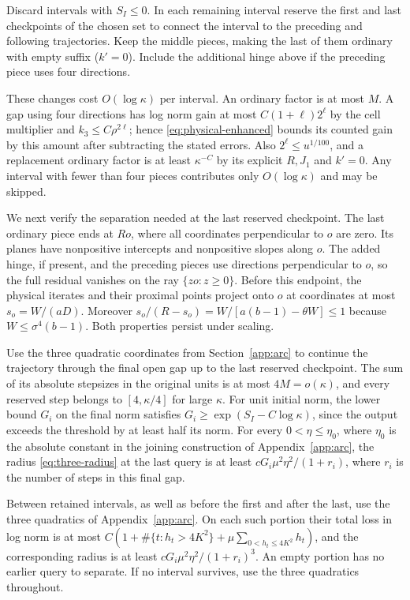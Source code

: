 \documentclass[11pt]{article}
\theoremstyle{definition}
\begin{document}
Discard intervals with $S_I\le0$. In each remaining interval reserve the first and last checkpoints of the chosen set to connect the interval to the preceding and following trajectories. Keep the middle pieces, making the last of them ordinary with empty suffix ($k'=0$). Include the additional hinge above if the preceding piece uses four directions.

These changes cost $O(\log\kappa)$ per interval. An ordinary factor is at most $M$. A gap using four directions has log norm gain at most $C(1+\ell)2^\ell$ by the cell multiplier and $k_3\le C\rho^{2\ell}$; hence \eqref{eq:physical-enhanced} bounds its counted gain by this amount after subtracting the stated errors. Also $2^\ell\le u^{1/100}$, and a replacement ordinary factor is at least $\kappa^{-C}$ by its explicit $R,J_1$ and $k'=0$. Any interval with fewer than four pieces contributes only $O(\log\kappa)$ and may be skipped.

We next verify the separation needed at the last reserved checkpoint.
The last ordinary piece ends at \(Ro\), where all coordinates perpendicular to $o$ are zero. Its planes have nonpositive intercepts and nonpositive slopes along $o$. The added hinge, if present, and the preceding pieces use directions perpendicular to $o$, so the full residual vanishes on the ray $\{zo:z\ge0\}$. Before this endpoint, the physical iterates and their proximal points project onto $o$ at coordinates at most $s_o=W/(aD)$. Moreover $s_o/(R-s_o)=W/[a(b-1)-\theta W]\le1$ because $W\le\sigma^4(b-1)$. Both properties persist under scaling.

Use the three quadratic coordinates from Section~\ref{app:arc} to continue the trajectory through the final open gap up to the last reserved checkpoint. The sum of its absolute stepsizes in the original units is at most $4M=o(\kappa)$, and every reserved step belongs to $[4,\kappa/4]$ for large $\kappa$. For unit initial norm, the lower bound $G_i$ on the final norm satisfies $G_i\ge\exp(S_I-C\log\kappa)$, since the output exceeds the threshold by at least half its norm. For every \(0<\eta\le\eta_0\), where \(\eta_0\) is the absolute constant
in the joining construction of Appendix~\ref{app:arc}, the radius
\eqref{eq:three-radius} at the last query is at least $cG_i\mu^2\eta^2/(1+r_i)$, where $r_i$ is the number of steps in this final gap.

Between retained intervals, as well as before the first and after the last, use the three quadratics of Appendix~\ref{app:arc}. On each such portion their total loss in log norm is at most $C(1+\#\{t:h_t>4K^2\}+\mu\sum_{0<h_t\le4K^2}h_t)$, and the corresponding radius is at least $cG_i\mu^2\eta^2/(1+r_i)^3$. An empty portion has no earlier query to separate. If no interval survives, use the three quadratics throughout.
\end{document}
